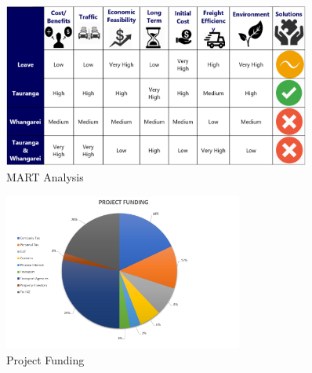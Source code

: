 \begin{figure}
\centering
\includegraphics[width=0.9\textwidth]{mart1.png}
\centering
\caption{MART Analysis}
\end{figure}
\begin{figure}
\centering
\includegraphics[width=0.7\textwidth]{ProjectFunding.png}
\centering
\caption{Project Funding}
\end{figure}


\clearpage
